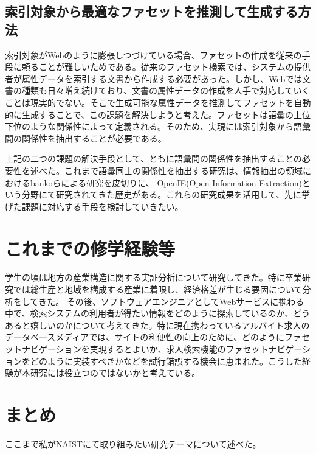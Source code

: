 \documentclass[a4j,10pt, twocolumn]{jarticle}
\begin{document}
 \subsection{索引対象から最適なファセットを推測して生成する方法}
 索引対象がWebのように膨張しつづけている場合、ファセットの作成を従来の手段に頼ることが難しいためである。従来のファセット検索では、システムの提供者が属性データを索引する文書から作成する必要があった。しかし、Webでは文書の種類も日々増え続けており、文書の属性データの作成を人手で対応していくことは現実的でない。そこで生成可能な属性データを推測してファセットを自動的に生成することで、この課題を解決しようと考えた。ファセットは語彙の上位下位のような関係性によって定義される。そのため、実現には索引対象から語彙間の関係性を抽出することが必要である。

上記の二つの課題の解決手段として、ともに語彙間の関係性を抽出することの必要性を述べた。これまで語彙同士の関係性を抽出する研究は、情報抽出の領域におけるbankoらによる研究\cite{banko}を皮切りに、 OpenIE(Open Information Extraction)という分野にて研究されてきた歴史がある\cite{niklaus}。これらの研究成果を活用して、先に挙げた課題に対応する手段を検討していきたい。
\section{これまでの修学経験等}
 学生の頃は地方の産業構造に関する実証分析について研究してきた。特に卒業研究では総生産と地域を構成する産業に着眼し、経済格差が生じる要因について分析をしてきた。
 その後、ソフトウェアエンジニアとしてWebサービスに携わる中で、検索システムの利用者が得たい情報をどのように探索しているのか、どうあると嬉しいのかについて考えてきた。特に現在携わっているアルバイト求人のデータベースメディアでは、サイトの利便性の向上のために、どのようにファセットナビゲーションを実現するとよいか、求人検索機能のファセットナビゲーションをどのように実装すべきかなどを試行錯誤する機会に恵まれた。こうした経験が本研究には役立つのではないかと考えている。

\section{まとめ}
ここまで私がNAISTにて取り組みたい研究テーマについて述べた。
\end{document}
